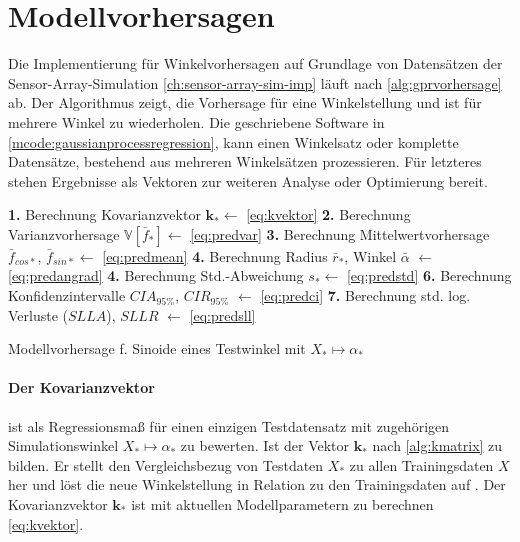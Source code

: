 \clearpage


\section{Modellvorhersagen}\label{sec:gprpred}


Die Implementierung für Winkelvorhersagen auf Grundlage von Datensätzen der Sensor-Array-Simulation \autoref{ch:sensor-array-sim-imp} läuft nach \autoref{alg:gprvorhersage} ab. Der Algorithmus zeigt, die Vorhersage für eine Winkelstellung und ist für mehrere Winkel zu wiederholen. Die geschriebene Software in \autoref{mcode:gaussianprocessregression}, kann einen Winkelsatz oder komplette Datensätze, bestehend aus mehreren Winkelsätzen prozessieren. Für letzteres stehen Ergebnisse als Vektoren zur weiteren Analyse oder Optimierung bereit.


\begin{algorithm}[htp]
	\SetAlgoLined
	\textbf{1.} Berechnung Kovarianzvektor $\mathbf{k}_* \leftarrow$ \autoref{eq:kvektor}\;
	\textbf{2.} Berechnung Varianzvorhersage $\mathbb{V}\left[ \bar{f}_* \right] \leftarrow$ \autoref{eq:predvar}\;
	\textbf{3.} Berechnung Mittelwertvorhersage $\bar{f}_{cos*}$, $\bar{f}_{sin*} \leftarrow$ \autoref{eq:predmean}\;
	\textbf{4.} Berechnung Radius $\bar{r}_*$, Winkel $\bar{\alpha}$ $\leftarrow$ \autoref{eq:predangrad}\;
	\textbf{4.} Berechnung Std.-Abweichung $s_* \leftarrow$ \autoref{eq:predstd}\;
	\textbf{6.} Berechnung Konfidenzintervalle $CIA_{95\%}$, $CIR_{95\%}$ $\leftarrow$ \autoref{eq:predci}\;
	\textbf{7.} Berechnung std. log. Verluste ($SLLA$), $SLLR$ $\leftarrow$ \autoref{eq:predsll}\;
	\caption{Modellvorhersage f. Sinoide eines Testwinkel mit $X_* \mapsto \alpha_*$}
	\label{alg:gprvorhersage}
\end{algorithm}


\paragraph*{Der Kovarianzvektor} ist als Regressionsmaß für einen einzigen Testdatensatz mit zugehörigen Simulationswinkel $X_* \mapsto \alpha_*$ zu bewerten. Ist der Vektor $\mathbf{k}_*$ nach \autoref{alg:kmatrix} zu bilden. Er stellt den Vergleichsbezug von Testdaten $X_*$ zu allen Trainingsdaten $X$ her und löst die neue Winkelstellung in Relation zu den Trainingsdaten auf \cite{Rasmussen2006}. Der Kovarianzvektor $\mathbf{k}_*$ ist mit aktuellen Modellparametern zu berechnen \autoref{eq:kvektor}.

